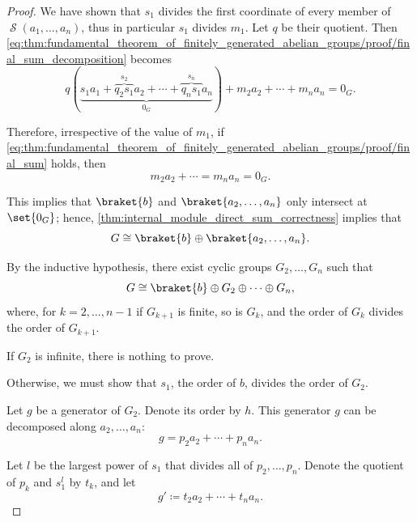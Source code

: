 \begin{proof}
  We have shown that \( s_1 \) divides the first coordinate of every member of \( \mscrS(a_1, \ldots, a_n) \), thus in particular \( s_1 \) divides \( m_1 \). Let \( q \) be their quotient. Then \eqref{eq:thm:fundamental_theorem_of_finitely_generated_abelian_groups/proof/final_sum_decomposition} becomes
  \begin{equation*}
    q(\underbrace{s_1 a_1 + \overbrace{q_2 s_1}^{s_2} a_2 + \cdots + \overbrace{q_n s_1}^{s_n} a_n}_{0_G}) + m_2 a_2 + \cdots + m_n a_n = 0_G.
  \end{equation*}

  Therefore, irrespective of the value of \( m_1 \), if \eqref{eq:thm:fundamental_theorem_of_finitely_generated_abelian_groups/proof/final_sum} holds, then
  \begin{equation*}
    m_2 a_2 + \cdots = m_n a_n = 0_G.
  \end{equation*}

  This implies that \( \braket{ b } \) and \( \braket{ a_2, \ldots, a_n } \) only intersect at \( \set{ 0_G } \); hence, \cref{thm:internal_module_direct_sum_correctness} implies that
  \begin{equation*}
    G \cong \braket{ b } \oplus \braket{ a_2, \ldots, a_n }.
  \end{equation*}

  By the inductive hypothesis, there exist cyclic groups \( G_2, \ldots, G_n \) such that
  \begin{equation*}
    G \cong \braket{ b } \oplus G_2 \oplus \cdots \oplus G_n,
  \end{equation*}
  where, for \( k = 2, \ldots, n - 1 \) if \( G_{k+1} \) is finite, so is \( G_k \), and the order of \( G_k \) divides the order of \( G_{k+1} \).

   If \( G_2 \) is infinite, there is nothing to prove.

  Otherwise, we must show that \( s_1 \), the order of \( b \), divides the order of \( G_2 \).

  Let \( g \) be a generator of \( G_2 \). Denote its order by \( h \). This generator \( g \) can be decomposed along \( a_2, \ldots, a_n \):
  \begin{equation*}
    g = p_2 a_2 + \cdots + p_n a_n.
  \end{equation*}

  Let \( l \) be the largest power of \( s_1 \) that divides all of \( p_2, \ldots, p_n \). Denote the quotient of \( p_k \) and \( s_1^l \) by \( t_k \), and let
  \begin{equation*}
    g' \coloneqq t_2 a_2 + \cdots + t_n a_n.
  \end{equation*}


\end{proof}
